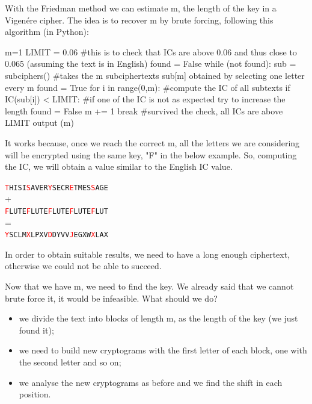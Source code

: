 \documentclass[a4paper, 12pt]{report}
\begin{document}
With the Friedman method we can estimate m, the length of the key in a Vigenére cipher. The idea is to recover m by brute forcing, following this algorithm (in Python):

\begin{python}
	m=1
	LIMIT = 0.06 #this is to check that ICs are above 0.06 and thus close to 0.065 (assuming the text is in English)
	found = False
	while (not found):
		sub = subciphers() #takes the m subciphertexts sub[m] obtained by selecting one letter every m
		found = True
		for i in range(0,m): #compute the IC of all subtexts
			if IC(sub[i]) < LIMIT:
				#if one of the IC is not as expected try to increase the length
				found = False
				m += 1
				break
	#survived the check, all ICs are above LIMIT
	output (m)
\end{python}
It works because, once we reach the correct m, all the letters we are considering will be encrypted using the same key, "F" in the below example. So, computing the IC, we will obtain a value similar to the English IC value.
\begin{center}
	\texttt{\textcolor{red}{T}HISI\textcolor{red}{S}AVER\textcolor{red}{Y}SECR\textcolor{red}{E}TMES\textcolor{red}{S}AGE}\\
	+\\
	\texttt{\textcolor{red}{F}LUTE\textcolor{red}{F}LUTE\textcolor{red}{F}LUTE\textcolor{red}{F}LUTE\textcolor{red}{F}LUT}\\
	=\\
	\texttt{\textcolor{red}{Y}SCLM\textcolor{red}{X}LPXV\textcolor{red}{D}DYVV\textcolor{red}{J}EGXW\textcolor{red}{X}LAX}
\end{center}

In order to obtain suitable results, we need to have a long enough ciphertext, otherwise we could not be able to succeed.

Now that we have m, we need to find the key. We already said that we cannot brute force it, it would be infeasible. What should we do?
\begin{itemize}
	\item we divide the text into blocks of length m, as the length of the key (we just found it);
	\item we need to build new cryptograms with the first letter of each block, one with the second letter and so on;
	\item we analyse the new cryptograms as before and we find the shift in each position.
\end{itemize}
\end{document}
